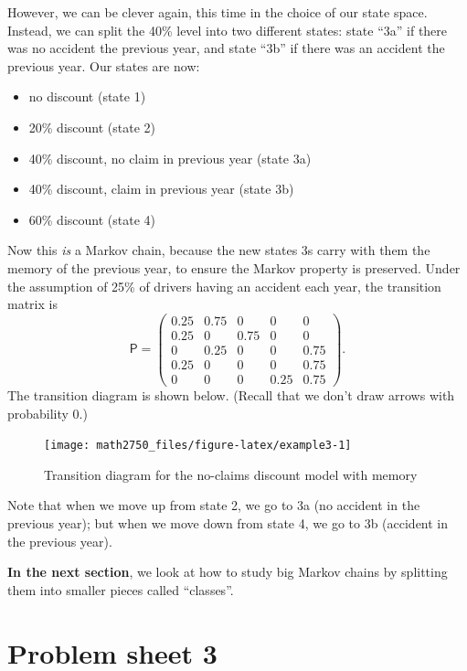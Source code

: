 \documentclass[
  a4paper,
]{article}
\providecommand{\tightlist}{%
  \setlength{\itemsep}{0pt}\setlength{\parskip}{0pt}}
\theoremstyle{definition}
\theoremstyle{definition}
\theoremstyle{definition}
\theoremstyle{remark}
\begin{document}
However, we can be clever again, this time in the choice of our state space. Instead, we can split the 40\% level into two different states: state ``3a'' if there was no accident the previous year, and state ``3b'' if there was an accident the previous year. Our states are now:

\begin{itemize}
\tightlist
\item
  no discount (state 1)
\item
  20\% discount (state 2)
\item
  40\% discount, no claim in previous year (state 3a)
\item
  40\% discount, claim in previous year (state 3b)
\item
  60\% discount (state 4)
\end{itemize}

Now this \emph{is} a Markov chain, because the new states 3s carry with them the memory of the previous year, to ensure the Markov property is preserved. Under the assumption of 25\% of drivers having an accident each year, the transition matrix is
\[
\mathsf P=\begin{pmatrix}
0.25 & 0.75 & 0 & 0 & 0\\
0.25 & 0 & 0.75 & 0 & 0\\
0 & 0.25 & 0 & 0 & 0.75\\
0.25 & 0 & 0 & 0 & 0.75\\
0 & 0 & 0 & 0.25 & 0.75\end{pmatrix}.
\]
The transition diagram is shown below. (Recall that we don't draw arrows with probability 0.)

\begin{figure}

{\centering \texttt{[image: math2750\_files/figure-latex/example3-1]} 

}

\caption{Transition diagram for the no-claims discount model with memory}\label{fig:example3}
\end{figure}

Note that when we move up from state 2, we go to 3a (no accident in the previous year); but when we move down from state 4, we go to 3b (accident in the previous year).

\textbf{In the next section}, we look at how to study big Markov chains by splitting them into smaller pieces called ``classes''.

\hypertarget{P03}{%
\section*{Problem sheet 3}\label{P03}}
\end{document}
